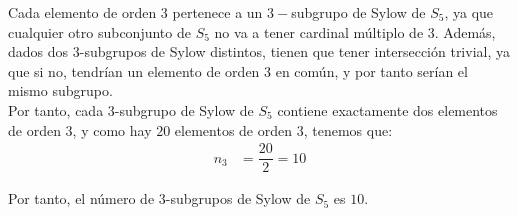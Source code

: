 \documentclass[12pt]{article}
\begin{document}
\begin{ejercicio}
\begin{enumerate}
            Cada elemento de orden $3$ pertenece a un $3-$subgrupo de Sylow de $S_5$, ya que cualquier otro subconjunto de $S_5$ no va a tener cardinal múltiplo de $3$. Además, dados dos $3$-subgrupos de Sylow distintos, tienen que tener intersección trivial, ya que si no, tendrían un elemento de orden $3$ en común, y por tanto serían el mismo subgrupo.\\
            
            Por tanto, cada $3$-subgrupo de Sylow de $S_5$ contiene exactamente dos elementos de orden $3$, y como hay $20$ elementos de orden $3$, tenemos que:
            \begin{align*}
                n_3 & = \dfrac{20}{2} = 10
            \end{align*}

            Por tanto, el número de $3$-subgrupos de Sylow de $S_5$ es $10$.
        \end{enumerate}
    \end{ejercicio}
\end{document}
